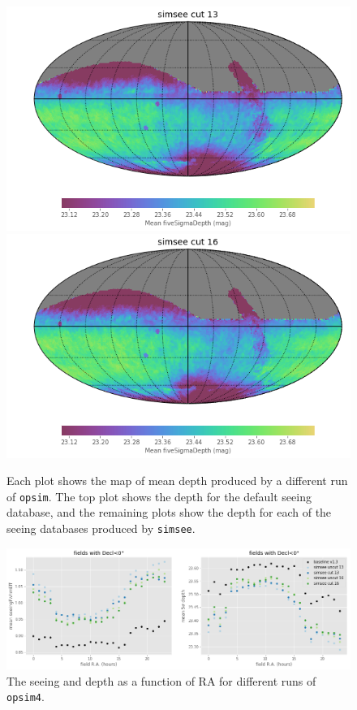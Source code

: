 \documentclass[\docopts]{\docclass}
\begin{document}
\begin{figure}
\endminipage\hfill
{}
  \includegraphics[width=\columnwidth]{depth_map_ss58779y13_v1_3_10yrs.png}
\endminipage\hfill
{}
  \includegraphics[width=\columnwidth]{depth_map_ss58779y16_v1_3_10yrs.png}
\endminipage\hfill
  \caption{Each plot shows the map of mean depth
    produced by a different run of \texttt{opsim}. The top plot
    shows the depth for the default seeing database, and the
    remaining plots show the depth for each of the seeing databases
    produced by \texttt{simsee}.} 
  \label{fig:simdepthmaps}
\end{figure}

\begin{figure}
  \includegraphics[width=\columnwidth]{seeing_depth_by_ra.png}
  \caption{The seeing and depth as a function of RA for different runs
  of \texttt{opsim4}.} 
  \label{fig:seelimra}
\end{figure}
\end{document}
